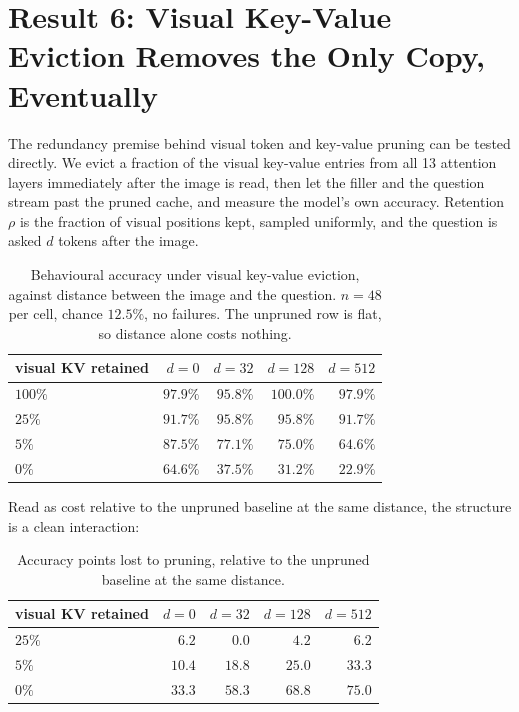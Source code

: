 \documentclass[11pt]{article}
\begin{document}
\section{Result 6: Visual Key-Value Eviction Removes the Only Copy, Eventually}

The redundancy premise behind visual token and key-value pruning can be tested
directly. We evict a fraction of the visual key-value entries from all 13
attention layers immediately after the image is read, then let the filler and
the question stream past the pruned cache, and measure the model's own
accuracy. Retention $\rho$ is the fraction of visual positions kept, sampled
uniformly, and the question is asked $d$ tokens after the image.

\begin{table}[h]
\centering\small
\begin{tabular}{lrrrr}
\toprule
visual KV retained & $d{=}0$ & $d{=}32$ & $d{=}128$ & $d{=}512$ \\
\midrule
$100\%$ & $97.9\%$ & $95.8\%$ & $100.0\%$ & $97.9\%$ \\
$25\%$  & $91.7\%$ & $95.8\%$ & $95.8\%$  & $91.7\%$ \\
$5\%$   & $87.5\%$ & $77.1\%$ & $75.0\%$  & $64.6\%$ \\
$0\%$   & $64.6\%$ & $37.5\%$ & $31.2\%$  & $22.9\%$ \\
\bottomrule
\end{tabular}
\caption{Behavioural accuracy under visual key-value eviction, against distance
between the image and the question. $n = 48$ per cell, chance $12.5\%$, no
failures. The unpruned row is flat, so distance alone costs nothing.}
\label{tab:eviction}
\end{table}

Read as cost relative to the unpruned baseline at the same distance, the
structure is a clean interaction:

\begin{table}[h]
\centering\small
\begin{tabular}{lrrrr}
\toprule
visual KV retained & $d{=}0$ & $d{=}32$ & $d{=}128$ & $d{=}512$ \\
\midrule
$25\%$ & $6.2$  & $0.0$  & $4.2$  & $6.2$ \\
$5\%$  & $10.4$ & $18.8$ & $25.0$ & $33.3$ \\
$0\%$  & $33.3$ & $58.3$ & $68.8$ & $75.0$ \\
\bottomrule
\end{tabular}
\caption{Accuracy points lost to pruning, relative to the unpruned baseline at
the same distance.}
\label{tab:eviction_cost}
\end{table}
\end{document}
